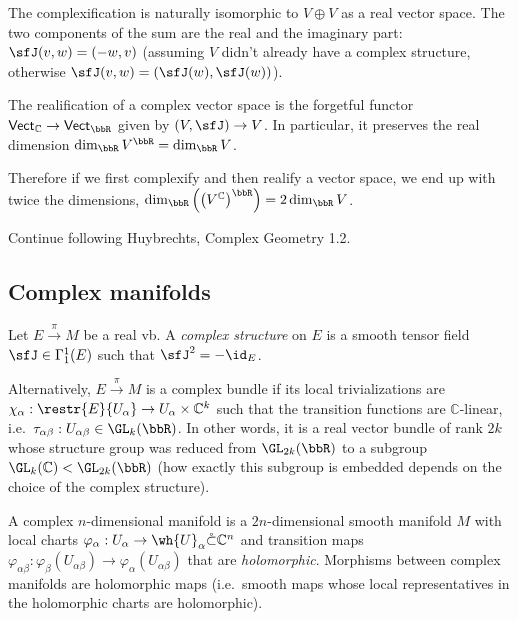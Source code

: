 The complexification is naturally isomorphic to $V\oplus V$ as a real vector space. The two components of the sum are the real and the imaginary part: $\sfJ(v,w)=(-w,v)$ (assuming $V$ didn't already have a complex structure, otherwise $\sfJ(v,w)=(\sfJ(w),\sfJ(w))$).


\begin{defn}[Realification]
    The realification of a complex vector space is the forgetful functor $\mathsf{Vect}_\mathbb{C}\to\mathsf{Vect}_\bbR $ given by $(V,\sfJ)\to V$. In particular, it preserves the real dimension $\dim_\bbR V^\bbR =\dim_\bbR V$.
\end{defn}

Therefore if we first complexify and then realify a vector space, we end up with twice the dimensions, $\dim_\bbR \left(\left(V^\mathbb{C}\right)^\bbR \right)=2\dim_\bbR V$.


Continue following Huybrechts, Complex Geometry 1.2.







\subsection{Complex manifolds}

\begin{defn}
    Let $E\overset\pi\to M$ be a real \gls{vb}. A \emph{complex structure} on $E$ is a smooth tensor field $\sfJ\in\Gamma^1_1(E)$ such that $\sfJ^2=-\id_E$.
    
    Alternatively, $E\overset\pi\to M$ is a complex bundle if its local trivializations are $\chi_\alpha:\restr{E}{U_\alpha}\to U_\alpha\times \mathbb{C}^k$ such that the transition functions are $\mathbb{C}$-linear, i.e.\ $\tau_{\alpha\beta}:U_{\alpha\beta}\in \GL_k(\bbR )$. In other words, it is a real vector bundle of rank $2k$ whose structure group was reduced from $\GL_{2k}(\bbR )$ to a subgroup $\GL_k(\mathbb{C})<\GL_{2k}(\bbR )$ (how exactly this subgroup is embedded depends on the choice of the complex structure).
\end{defn}

\begin{defn}
    A complex $n$-dimensional manifold is a $2n$-dimensional smooth manifold $M$ with local charts $\varphi_\alpha:U_\alpha\to\wh{U}_\alpha\mathring\subset\mathbb{C}^n$ and transition maps $\varphi_{\alpha\beta}:\varphi_\beta(U_{\alpha\beta})\to\varphi_\alpha(U_{\alpha\beta})$ that are \emph{holomorphic}. Morphisms between complex manifolds are holomorphic maps (i.e.\ smooth maps whose local representatives in the holomorphic charts are holomorphic).
\end{defn}


